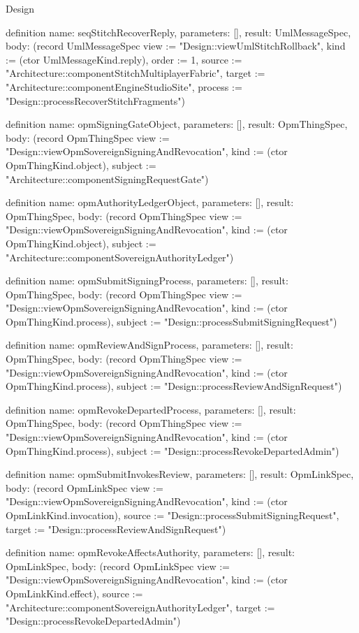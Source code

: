 \begin{lexlean}{Design}
\begin{semanticmodule}
definition{
  name: seqStitchRecoverReply,
  parameters: [],
  result: UmlMessageSpec,
  body: (record UmlMessageSpec {view := "Design::viewUmlStitchRollback", kind := (ctor UmlMessageKind.reply), order := 1, source := "Architecture::componentStitchMultiplayerFabric", target := "Architecture::componentEngineStudioSite", process := "Design::processRecoverStitchFragments"})
}

definition{
  name: opmSigningGateObject,
  parameters: [],
  result: OpmThingSpec,
  body: (record OpmThingSpec {view := "Design::viewOpmSovereignSigningAndRevocation", kind := (ctor OpmThingKind.object), subject := "Architecture::componentSigningRequestGate"})
}

definition{
  name: opmAuthorityLedgerObject,
  parameters: [],
  result: OpmThingSpec,
  body: (record OpmThingSpec {view := "Design::viewOpmSovereignSigningAndRevocation", kind := (ctor OpmThingKind.object), subject := "Architecture::componentSovereignAuthorityLedger"})
}

definition{
  name: opmSubmitSigningProcess,
  parameters: [],
  result: OpmThingSpec,
  body: (record OpmThingSpec {view := "Design::viewOpmSovereignSigningAndRevocation", kind := (ctor OpmThingKind.process), subject := "Design::processSubmitSigningRequest"})
}

definition{
  name: opmReviewAndSignProcess,
  parameters: [],
  result: OpmThingSpec,
  body: (record OpmThingSpec {view := "Design::viewOpmSovereignSigningAndRevocation", kind := (ctor OpmThingKind.process), subject := "Design::processReviewAndSignRequest"})
}

definition{
  name: opmRevokeDepartedProcess,
  parameters: [],
  result: OpmThingSpec,
  body: (record OpmThingSpec {view := "Design::viewOpmSovereignSigningAndRevocation", kind := (ctor OpmThingKind.process), subject := "Design::processRevokeDepartedAdmin"})
}

definition{
  name: opmSubmitInvokesReview,
  parameters: [],
  result: OpmLinkSpec,
  body: (record OpmLinkSpec {view := "Design::viewOpmSovereignSigningAndRevocation", kind := (ctor OpmLinkKind.invocation), source := "Design::processSubmitSigningRequest", target := "Design::processReviewAndSignRequest"})
}

definition{
  name: opmRevokeAffectsAuthority,
  parameters: [],
  result: OpmLinkSpec,
  body: (record OpmLinkSpec {view := "Design::viewOpmSovereignSigningAndRevocation", kind := (ctor OpmLinkKind.effect), source := "Architecture::componentSovereignAuthorityLedger", target := "Design::processRevokeDepartedAdmin"})
}


\end{semanticmodule}
\end{lexlean}
